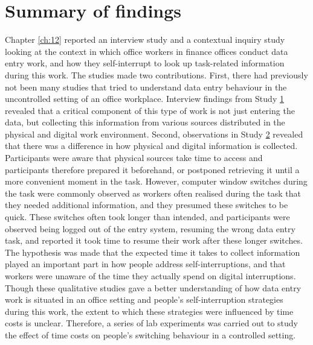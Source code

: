 \section{Summary of findings}
Chapter \ref{ch:12} reported an interview study and a contextual inquiry study looking at the context in which office workers in finance offices conduct data entry work, and how they self-interrupt to look up task-related information during this work. The studies made two contributions. First, there had previously not been many studies that tried to understand data entry behaviour in the uncontrolled setting of an office workplace. Interview findings from Study \hyperref[st:Study1]{1} revealed that a critical component of this type of work is not just entering the data, but collecting this information from various sources distributed in the physical and digital work environment. Second, observations in Study \hyperref[st:Study2]{2} revealed that there was a difference in how physical and digital information is collected. Participants were aware that physical sources take time to access and participants therefore prepared it beforehand, or postponed retrieving it until a more convenient moment in the task. However, computer window switches during the task were commonly observed as workers often realised during the task that they needed additional information, and they presumed these switches to be quick. These switches often took longer than intended, and participants were observed being logged out of the entry system, resuming the wrong data entry task, and reported it took time to resume their work after these longer switches. The hypothesis was made that the expected time it takes to collect information played an important part in how people address self-interruptions, and that workers were unaware of the time they actually spend on digital interruptions. Though these qualitative studies gave a better understanding of how data entry work is situated in an office setting and people's self-interruption strategies during this work, the extent to which these strategies were influenced by time costs is unclear. Therefore, a series of lab experiments was carried out to study the effect of time costs on people's switching behaviour in a controlled setting.

